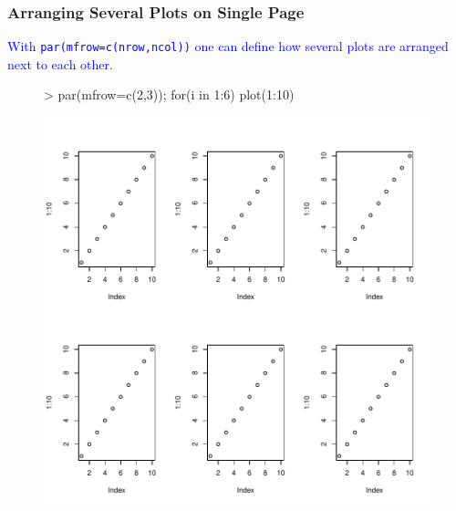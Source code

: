 \documentclass{beamer}
\newcommand{\Rfunction}[1]{{\texttt{#1}}}
\begin{document}
\begin{frame}[containsverbatim]  
	\frametitle{Arranging Several Plots on Single Page}
\scriptsize
\textcolor{blue}{With \Rfunction{par(mfrow=c(nrow,ncol))} one can define how several plots are arranged next to each other.}
\begin{figure}
  \centering
\begin{Schunk}
\begin{Sinput}
> par(mfrow=c(2,3)); for(i in 1:6) { plot(1:10) } 
\end{Sinput}
\end{Schunk}
\includegraphics{fig--023}
\label{fig:arrange1}
\end{figure}
\end{frame}
\end{document}
